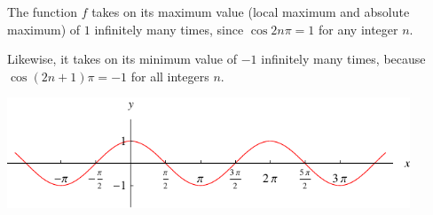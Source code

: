 \begin{frame}
\begin{example}[Example 1, p. 205]
The function $f$ takes on its maximum value (local maximum and absolute maximum) of $1$ infinitely many times, since $\cos 2n \pi = 1$ for any integer $n$.

Likewise, it takes on its minimum value of $-1$ infinitely many times, because $\cos (2n+1)\pi = -1$ for all integers $n$.

\includegraphics[width=12cm]{maxima-minima/pictures/app-d-cos.pdf}%
\end{example}
\end{frame}

